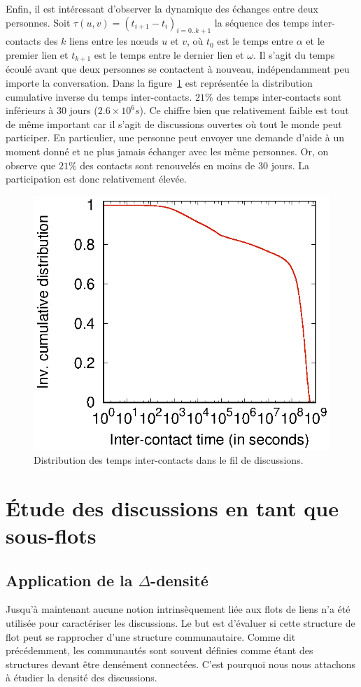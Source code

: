 Enfin, il est intéressant d'observer la dynamique des échanges entre deux personnes.
Soit $\tau(u,v) = (t_{i+1}-t_i)_{i=0..k+1}$ la séquence des temps inter-contacts des $k$ liens entre les n\oe uds $u$ et $v$, où $t_0$ est le temps entre $\alpha$ et le premier lien et $t_{k+1}$ est le temps entre le dernier lien et $\omega$.
Il s'agit du temps écoulé avant que deux personnes se contactent à nouveau, indépendamment peu importe la conversation.
Dans la figure~\ref{fig:ict_discussion} est représentée la distribution cumulative inverse du temps inter-contacts. 
$21\%$ des temps inter-contacts sont inférieurs à 30 jours ($2.6\times 10^6 s$).
Ce chiffre bien que relativement faible est tout de même important car il s'agit de discussions ouvertes où tout le monde peut participer. 
En particulier, une personne peut envoyer une demande d'aide à un moment donné et ne plus jamais échanger avec les même personnes.
Or, on observe que $21\%$ des contacts sont renouvelés en moins de 30 jours.
La participation est donc relativement élevée.
\begin{figure}
	\centering
	\includegraphics[width=0.49\linewidth]{img/mailing/ict-ccdf.eps}
	\caption{Distribution des temps inter-contacts dans le fil de discussions.}
	\label{fig:ict_discussion}
\end{figure}

\section{\'Etude des discussions en tant que sous-flots}
\label{etude_discussion}
\subsection{Application de la \texorpdfstring{$\Delta$}{delta}-densité}
\label{delta_densite}

Jusqu'à maintenant aucune notion intrinsèquement liée aux flots de liens n'a été utilisée pour caractériser les discussions.
Le but est d'évaluer si cette structure de flot peut se rapprocher d'une structure communautaire.
Comme dit précédemment, les communautés sont souvent définies comme étant des structures devant être densément connectées.
C'est pourquoi nous nous attachons à étudier la densité des discussions.

